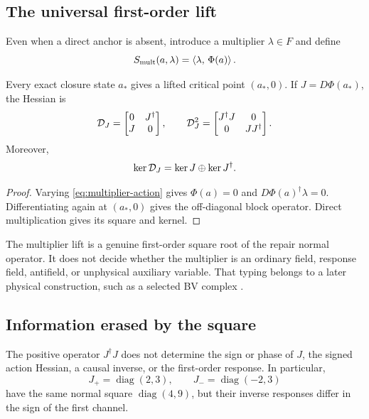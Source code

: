 \documentclass[11pt,a4paper]{article}
\begin{document}
\subsection{The universal first-order lift}

Even when a direct anchor is absent, introduce a multiplier
\(\lambda\in F\) and define
\begin{equation}
S_{\mathrm{mult}}(a,\lambda)=\left\langle \lambda,\,\Phi(a) \right\rangle.
\label{eq:multiplier-action}
\end{equation}

\begin{theorem}
\label{thm:multiplier}
Every exact closure state \(a_*\) gives a lifted critical point
\((a_*,0)\).  If \(J=D\Phi(a_*)\), the Hessian is
\begin{equation}
\mathcal{D}_J=
\begin{bmatrix}
0&J^{\dagger}\\
J&0
\end{bmatrix},
\qquad
\mathcal{D}_J^2=
\begin{bmatrix}
J^{\dagger}J&0\\
0&JJ^{\dagger}
\end{bmatrix}.
\label{eq:multiplier-square}
\end{equation}
Moreover,
\[
\ker\mathcal{D}_J=\ker J\oplus\ker J^{\dagger}.
\]
\end{theorem}

\begin{proof}
Varying \eqref{eq:multiplier-action} gives
\(\Phi(a)=0\) and \(D\Phi(a)^{\dagger}\lambda=0\).  Differentiating again
at \((a_*,0)\) gives the off-diagonal block operator.  Direct multiplication
gives its square and kernel.
\end{proof}

The multiplier lift is a genuine first-order square root of the repair
normal operator.  It does not decide whether the multiplier is an ordinary
field, response field, antifield, or unphysical auxiliary variable.  That
typing belongs to a later physical construction, such as a selected BV
complex \cite{PTVV2011}.

\subsection{Information erased by the square}

\begin{proposition}
\label{prop:square-no-go}
The positive operator \(J^{\dagger}J\) does not determine the sign or phase
of \(J\), the signed action Hessian, a causal inverse, or the first-order
response.  In particular,
\[
J_+=\operatorname{diag}(2,3),
\qquad
J_- =\operatorname{diag}(-2,3)
\]
have the same normal square \(\operatorname{diag}(4,9)\), but their inverse
responses differ in the sign of the first channel.
\end{proposition}
\end{document}
